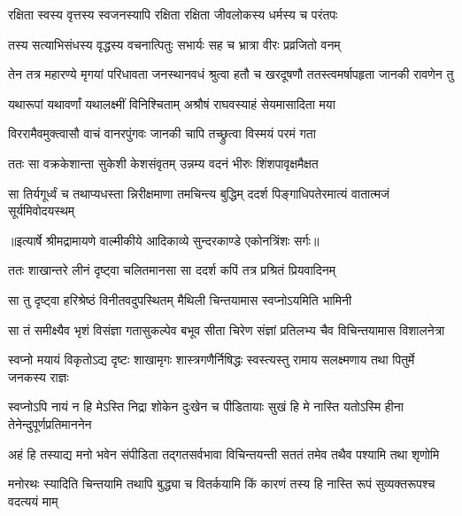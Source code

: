 \twolineshloka
{रक्षिता स्वस्य वृत्तस्य स्वजनस्यापि रक्षिता}
{रक्षिता जीवलोकस्य धर्मस्य च परंतपः} %

\twolineshloka
{तस्य सत्याभिसंधस्य वृद्धस्य वचनात्पितुः}
{सभार्यः सह च भ्रात्रा वीरः प्रव्रजितो वनम्} %

\threelineshloka
{तेन तत्र महारण्ये मृगयां परिधावता}
{जनस्थानवधं श्रुत्वा हतौ च खरदूषणौ}
{ततस्त्वमर्षापहृता जानकी रावणेन तु} %

\twolineshloka
{यथारूपां यथावर्णां यथालक्ष्मीं विनिश्चिताम्}
{अश्रौषं राघवस्याहं सेयमासादिता मया} %

\twolineshloka
{विररामैवमुक्त्वासौ वाचं वानरपुंगवः}
{जानकी चापि तच्छ्रुत्वा विस्मयं परमं गता} %

\twolineshloka
{ततः सा वक्रकेशान्ता सुकेशी केशसंवृतम्}
{उन्नम्य वदनं भीरुः शिंशपावृक्षमैक्षत} %

\fourlineindentedshloka
{सा तिर्यगूर्ध्वं च तथाप्यधस्ता}
{न्निरीक्षमाणा तमचिन्त्य बुद्धिम्}
{ददर्श पिङ्गाधिपतेरमात्यं}
{ वातात्मजं सूर्यमिवोदयस्थम्} %


{॥इत्यार्षे श्रीमद्रामायणे वाल्मीकीये आदिकाव्ये सुन्दरकाण्डे एकोनत्रिंशः सर्गः॥}


\twolineshloka
{ततः शाखान्तरे लीनं दृष्ट्वा चलितमानसा}
{सा ददर्श कपिं तत्र प्रश्रितं प्रियवादिनम्} %

\twolineshloka
{सा तु दृष्ट्वा हरिश्रेष्ठं विनीतवदुपस्थितम्}
{मैथिली चिन्तयामास स्वप्नोऽयमिति भामिनी} %

\fourlineindentedshloka
{सा तं समीक्ष्यैव भृशं विसंज्ञा}
{ गतासुकल्पेव बभूव सीता}
{चिरेण संज्ञां प्रतिलभ्य चैव}
{ विचिन्तयामास विशालनेत्रा} %

\fourlineindentedshloka
{स्वप्नो मयायं विकृतोऽद्य दृष्टः}
{ शाखामृगः शास्त्रगणैर्निषिद्धः}
{स्वस्त्यस्तु रामाय सलक्ष्मणाय}
{ तथा पितुर्मे जनकस्य राज्ञः} %

\fourlineindentedshloka
{स्वप्नोऽपि नायं न हि मेऽस्ति निद्रा}
{ शोकेन दुःखेन च पीडितायाः}
{सुखं हि मे नास्ति यतोऽस्मि हीना}
{ तेनेन्दुपूर्णप्रतिमाननेन} %

\fourlineindentedshloka
{अहं हि तस्याद्य मनो भवेन}
{ संपीडिता तद्गतसर्वभावा}
{विचिन्तयन्ती सततं तमेव}
{ तथैव पश्यामि तथा शृणोमि} %

\fourlineindentedshloka
{मनोरथः स्यादिति चिन्तयामि}
{ तथापि बुद्ध्या च वितर्कयामि}
{किं कारणं तस्य हि नास्ति रूपं}
{ सुव्यक्तरूपश्च वदत्ययं माम्} %

